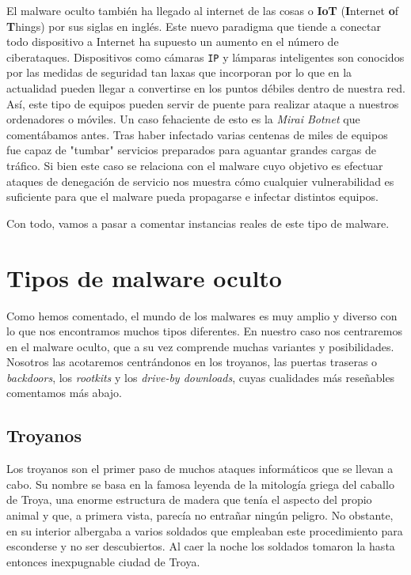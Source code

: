 \documentclass[12pt]{article}
\newcommand{\newpar} {
    \vskip 0.5cm
}
\begin{document}
            \newpar

            El malware oculto también ha llegado al internet de las cosas o \textbf{IoT} (\textbf{I}nternet \textbf{o}f \textbf{T}hings) por sus siglas en inglés. Este nuevo paradigma que tiende a conectar todo dispositivo a Internet ha supuesto un aumento en el número de ciberataques. Dispositivos como cámaras \texttt{IP} y lámparas inteligentes son conocidos por las medidas de seguridad tan laxas que incorporan por lo que en la actualidad pueden llegar a convertirse en los puntos débiles dentro de nuestra red. Así, este tipo de equipos pueden servir de puente para realizar ataque a nuestros ordenadores o móviles. Un caso fehaciente de esto es la \textit{Mirai Botnet} que comentábamos antes. Tras haber infectado varias centenas de miles de equipos fue capaz de "tumbar" servicios preparados para aguantar grandes cargas de tráfico. Si bien este caso se relaciona con el malware cuyo objetivo es efectuar ataques de denegación de servicio nos muestra cómo cualquier vulnerabilidad es suficiente para que el malware pueda propagarse e infectar distintos equipos.

            \newpar

            Con todo, vamos a pasar a comentar instancias reales de este tipo de malware.

    \section{Tipos de malware oculto}
        Como hemos comentado, el mundo de los malwares es muy amplio y diverso con lo que nos encontramos muchos tipos diferentes. En nuestro caso nos centraremos en el malware oculto, que a su vez comprende muchas variantes y posibilidades. Nosotros las acotaremos centrándonos en los troyanos, las puertas traseras o \textit{backdoors}, los \textit{rootkits} y los \textit{drive-by downloads}, cuyas cualidades más reseñables comentamos más abajo.

        \subsection{Troyanos}
            Los troyanos son el primer paso de muchos ataques informáticos que se llevan a cabo. Su nombre se basa en la famosa leyenda de la mitología griega del caballo de Troya, una enorme estructura de madera que tenía el aspecto del propio animal y que, a primera vista, parecía no entrañar ningún peligro. No obstante, en su interior albergaba a varios soldados que empleaban este procedimiento para esconderse y no ser descubiertos. Al caer la noche los soldados tomaron la hasta entonces inexpugnable ciudad de Troya.
\end{document}
